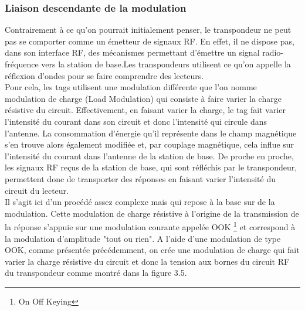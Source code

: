 \documentclass[11pt, a4paper, twoside]{book}
\begin{document}
\subsubsection{Liaison descendante de la modulation}
Contrairement à ce qu'on pourrait initialement penser, le transpondeur ne peut pas se comporter comme un émetteur de signaux RF. En effet, il ne dispose pas, dans son interface RF, des mécanismes permettant d'émettre un signal radio-fréquence vers la station de base.Les transpondeurs utilisent ce qu'on appelle la réflexion d'ondes pour se faire comprendre des lecteurs. \\

Pour cela, les tags utilisent une modulation différente que l'on nomme modulation de charge (Load Modulation) qui consiste à faire varier la charge résistive du circuit. Effectivement, en faisant varier la charge, le tag fait varier l'intensité du courant dans son circuit et donc l'intensité qui circule dans l'antenne. La consommation d'énergie qu'il représente dans le champ magnétique s'en trouve alors également modifiée et, par couplage magnétique, cela influe sur l'intensité du courant dans l'antenne de la station de base. De proche en proche, les signaux RF reçus de la station de base, qui sont réfléchis par le transpondeur, permettent donc de transporter des réponses en faisant varier l'intensité du circuit du lecteur.\\

Il s'agit ici d'un procédé assez complexe mais qui repose à la base sur de la modulation. Cette modulation de charge résistive à l'origine de la transmission de la réponse s'appuie sur une modulation courante appelée OOK \footnote{On Off Keying} et correspond à la modulation d'amplitude "tout ou rien". A l'aide d'une modulation de type OOK, comme présentée précédemment, on crée une modulation de charge qui fait varier la charge résistive du circuit et donc la tension aux bornes du circuit RF du transpondeur comme montré dans la figure 3.5.
\end{document}
